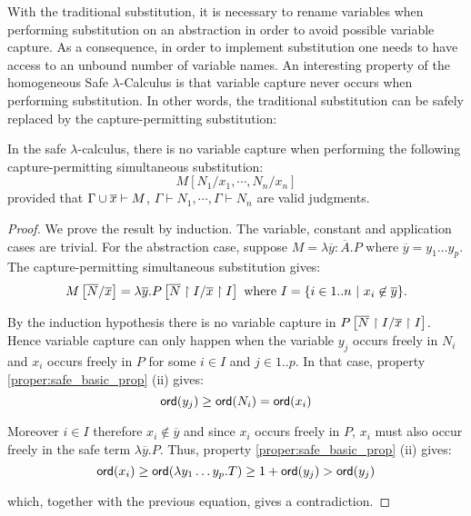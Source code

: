With the traditional substitution, it is necessary to rename
variables when performing substitution on an abstraction in order to
avoid possible variable capture. As a consequence, in order to
implement substitution one needs to have access to an unbound number
of variable names. An interesting property of the homogeneous Safe
$\lambda$-Calculus is that variable capture never occurs when
performing substitution. In other words, the traditional
substitution can be safely replaced by the capture-permitting
substitution:

\begin{lem}
\label{lem:homog_nocapture} In the safe $\lambda$-calculus, there is
no variable capture when performing the following capture-permitting
simultaneous substitution:
$$ M[N_1 / x_1 , \cdots, N_n / x_n] $$
provided that $\Gamma \cup \overline{x} \vdash M$, $\Gamma \vdash  N_1, \cdots ,\Gamma \vdash  N_n$ are valid judgments.
\end{lem}

\begin{proof}
We prove the result by induction. The variable, constant and
application cases are trivial. For the abstraction case, suppose $M
= \lambda \overline{y} : \overline{A}. P$ where $\overline{y} = y_1
\ldots y_p$. The capture-permitting simultaneous substitution gives:
$$M \left[ \overline{N}/\overline{x} \right] = \lambda \overline{y} . P
\left[ \overline{N} \upharpoonright I/\overline{x} \upharpoonright
I \right] \mbox{ where } I  = \{ i \in 1..n \ | \ x_i \not \in \overline{y}
\}. $$


By the induction hypothesis there is no variable capture in $P
\left[ \overline{N} \upharpoonright I/\overline{x} \upharpoonright
I \right]$. Hence variable capture can only happen when the variable $y_j$
occurs freely in $N_i$ and $x_i$ occurs freely in $P$ for some $i
\in I$ and $j \in 1..p$. In that case, property
\ref{proper:safe_basic_prop} (ii) gives:
$$ {\sf ord}(y_j) \geq {\sf ord}(N_i) = {\sf ord}(x_i)$$

Moreover $i\in I$ therefore $x_i \not \in \overline{y}$ and since $x_i$ occurs freely in $P$, $x_i$ must also occur freely in the safe term
$\lambda \overline{y}. P$. Thus, property \ref{proper:safe_basic_prop} (ii) gives:
$$ {\sf ord}(x_i) \geq {\sf ord}(\lambda y_1 \ldots y_p . T) \geq 1+ {\sf ord}(y_j) > {\sf ord}(y_j)$$

which, together with the previous equation, gives a contradiction.
\end{proof}




